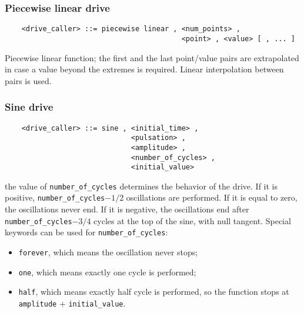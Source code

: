 \subsubsection{Piecewise linear drive}
\begin{verbatim}
    <drive_caller> ::= piecewise linear , <num_points> ,
                                          <point> , <value> [ , ... ]
\end{verbatim}
Piecewise linear function; the first and the last point/value pairs are
extrapolated in case a value beyond the extremes is required.
Linear interpolation between pairs is used.

\subsubsection{Sine drive}
\begin{verbatim}
    <drive_caller> ::= sine , <initial_time> ,
                              <pulsation> ,
                              <amplitude> ,
                              <number_of_cycles> , 
                              <initial_value>
\end{verbatim}
the value of \texttt{number\_of\_cycles} determines the behavior of the
drive. 
If it is positive, \texttt{number\_of\_cycles}$-1/2$ oscillations are
performed. 
If it is equal to zero, the oscillations never end. 
If it is negative, the oscillations end after 
\texttt{number\_of\_cycles}$-3/4$ cycles at the top of the sine, with null
tangent.
Special keywords can be used for \texttt{number\_of\_cycles}:
\begin{itemize}
	\item \texttt{forever}, which means the oscillation never stops;
	\item \texttt{one}, which means exactly one cycle is performed;
	\item \texttt{half}, which means exactly half cycle is performed,
	so the function stops at \texttt{amplitude} + \texttt{initial\_value}.
\end{itemize}

